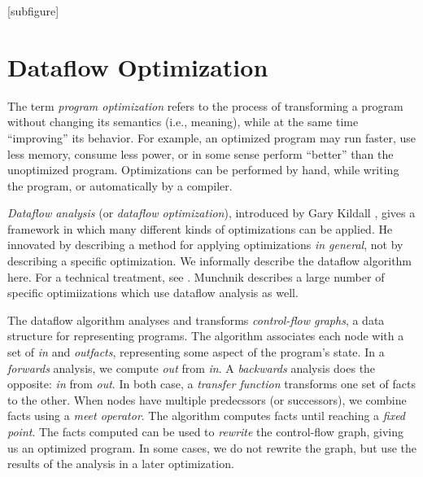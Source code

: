 \documentclass[12pt]{report}
\begin{document}

\UndefineShortVerb{\#}
[subfigure]
\renewcommand{\textfraction}{0.1}
\renewcommand{\topfraction}{0.9}
\newcommand{\inE}{\emph{in}\xspace}
\newcommand{\out}{\emph{out}\xspace}
\newcommand{\In}{\emph{In}\xspace}
\newcommand{\Out}{\emph{Out}\xspace}
\newcommand{\entryN}{\emph{E}\xspace}
\newcommand{\exitN}{\emph{X}\xspace}
\newcommand{\refNode}[1]{\ensuremath{B_{\ref{#1}}}\xspace}
\newcommand{\labelNode}[1]{\refstepcounter{nodeCounter}\label{#1}}
\DefineShortVerb{\#}

\chapter{Dataflow Optimization}
\label{ref_chapter_background}



The term \emph{program optimization} refers to the process of
transforming a program without changing its semantics (i.e., meaning),
while at the same time ``improving'' its behavior.  For example, an
optimized program may run faster, use less memory, consume less power,
or in some sense perform ``better'' than the unoptimized
program. Optimizations can be performed by hand, while writing
the program, or automatically by a compiler. 

\emph{Dataflow analysis} (or \emph{dataflow optimization}), introduced
by Gary Kildall \citep{Kildall1973}, gives a framework in which many
different kinds of optimizations can be applied. He innovated by
describing a method for applying optimizations \emph{in general}, not
by describing a specific optimization.  We informally describe the
dataflow algorithm here. For a technical treatment, see
\citep{AhoXX}. Munchnik \citep{MunchXX} describes a large number of
specific optimiizations which use dataflow analysis as well.

The dataflow algorithm analyses and transforms \emph{control-flow graphs}, a
data structure for representing programs. The algorithm associates each
node with a set of \inE and \out \emph{facts}, representing some
aspect of the program's state. In a \emph{forwards} analysis, we
compute \out from \inE. A \emph{backwards} analysis does the opposite:
\inE from \out.  In both case, a \emph{transfer function} transforms
one set of facts to the other. When nodes have multiple predecssors
(or successors), we combine facts using a \emph{meet operator}. The
algorithm computes facts until reaching a \emph{fixed point}. The
facts computed can be used to \emph{rewrite} the control-flow graph,
giving us an optimized program. In some cases, we do not rewrite the
graph, but use the results of the analysis in a later optimization.
\end{document}
